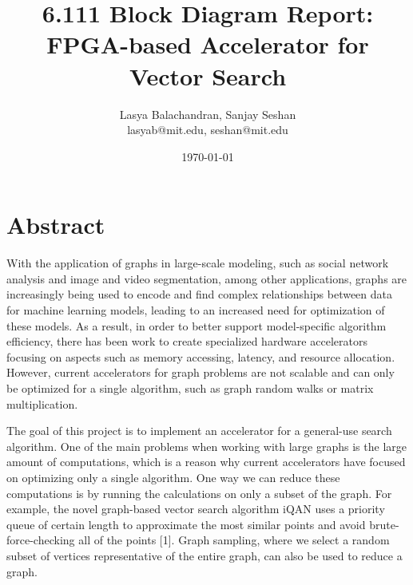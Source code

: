 \documentclass{article}
\title{6.111 Block Diagram Report: \\ FPGA-based Accelerator for Vector Search}
\author{Lasya Balachandran, Sanjay Seshan\\lasyab@mit.edu, seshan@mit.edu}
\date{\today}
\begin{document}
\maketitle



\section{Abstract}
With the application of graphs in large-scale modeling, such as social network analysis and image and video segmentation, among other applications, graphs are increasingly being used to encode and find complex relationships between data for machine learning models, leading to an increased need for optimization of these models. As a result, in order to better support model-specific algorithm efficiency, there has been work to create specialized hardware accelerators focusing on aspects such as memory accessing, latency, and resource allocation. However, current accelerators for graph problems are not scalable and can only be optimized for a single algorithm, such as graph random walks or matrix multiplication. 

The goal of this project is to implement an accelerator for a general-use search algorithm. One of the main problems when working with large graphs is the large amount of computations, which is a reason why current accelerators have focused on optimizing only a single algorithm. One way we can reduce these computations is by running the calculations on only a subset of the graph. For example, the novel graph-based vector search algorithm iQAN uses a priority queue of certain length to approximate the most similar points and avoid brute-force-checking all of the points [1]. Graph sampling, where we select a random subset of vertices representative of the entire graph, can also be used to reduce a graph.

\end{document}
